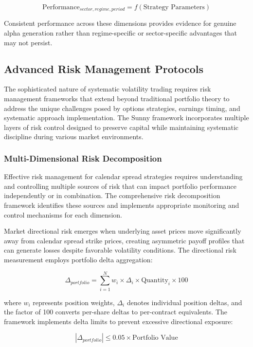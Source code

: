 \documentclass[
  american,
  11pt,
  11pt,
  letterpaper,
  onecolumn]{article}
\begin{document}
\[\text{Performance}_{sector,regime,period} = f(\text{Strategy Parameters})\]

Consistent performance across these dimensions provides evidence for
genuine alpha generation rather than regime-specific or sector-specific
advantages that may not persist.

\subsection{Advanced Risk Management
Protocols}\label{advanced-risk-management-protocols}

The sophisticated nature of systematic volatility trading requires risk
management frameworks that extend beyond traditional portfolio theory to
address the unique challenges posed by options strategies, earnings
timing, and systematic approach implementation. The Sunny framework
incorporates multiple layers of risk control designed to preserve
capital while maintaining systematic discipline during various market
environments.

\subsubsection{Multi-Dimensional Risk
Decomposition}\label{multi-dimensional-risk-decomposition}

Effective risk management for calendar spread strategies requires
understanding and controlling multiple sources of risk that can impact
portfolio performance independently or in combination. The comprehensive
risk decomposition framework identifies these sources and implements
appropriate monitoring and control mechanisms for each dimension.

Market directional risk emerges when underlying asset prices move
significantly away from calendar spread strike prices, creating
asymmetric payoff profiles that can generate losses despite favorable
volatility conditions. The directional risk measurement employs
portfolio delta aggregation:

\[\Delta_{portfolio} = \sum_{i=1}^{N} w_i \times \Delta_i \times \text{Quantity}_i \times 100\]

where \(w_i\) represents position weights, \(\Delta_i\) denotes
individual position deltas, and the factor of 100 converts per-share
deltas to per-contract equivalents. The framework implements delta
limits to prevent excessive directional exposure:

\[|\Delta_{portfolio}| \leq 0.05 \times \text{Portfolio Value}\]
\end{document}
